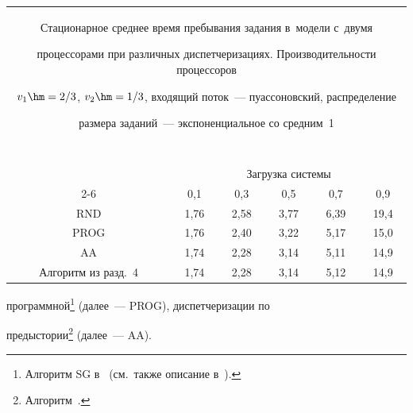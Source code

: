 \begin{table}[h!]\small


\begin{center}


\begin{tabular}{|c|c|c|c|c|c|}


\multicolumn{6}{p{85mm}}{Стационарное среднее время пребывания задания в~модели с~двумя 


процессорами при различных диспетчеризациях. Производительности процессоров 


$v_1\hm= 2/3$, $v_2\hm= 1/3$, входящий поток~--- пуассоновский, распределение 


размера заданий~--- экспоненциальное со средним~1}\\


\multicolumn{6}{c}{\ }\\[-2pt]


\hline


&\multicolumn{5}{c|}{Загрузка системы}\\


\cline{2-6}


\multicolumn{1}{|c|}{\raisebox{6pt}[0pt][0pt]{Алгоритм}}&0,1&0,3&0,5&0,7&0,9\\


\hline


RND&1,76&2,58&3,77&6,39&19,4\\


PROG&1,76&2,40&3,22&5,17&15,0\\


AA&1,74&2,28&3,14&5,11&14,9\\


Алгоритм из разд.~4&1,74&2,28&3,14&5,12&14,9\\


\hline


\end{tabular}


\end{center}


\end{table}





\addtocounter{footnote}{-2}


\noindent


программной\footnote{Алгоритм SG в~\cite[с.~184]{9-raz} (см.\ также описание в~\cite{10-raz}).} (далее~--- PROG), диспетчеризации по 


предыстории\footnote{Алгоритм~\cite{11-raz}.} (далее~--- AA). 





